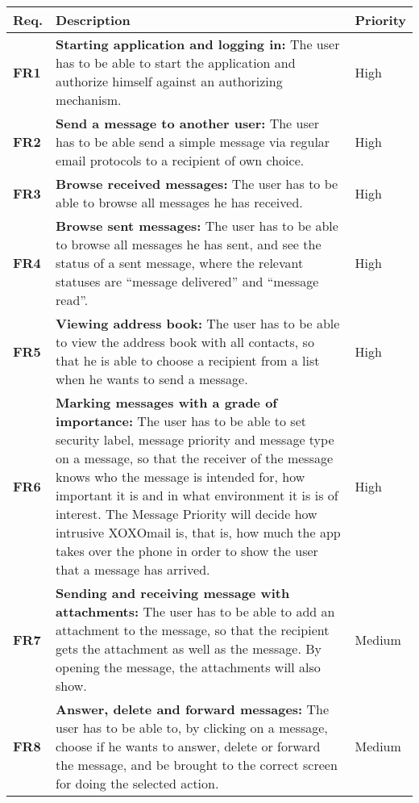 \begin{table}[hbt]
\begin{center}
\begin{tabular}{p{1.5cm}|p{12.5cm}|p{2cm}} \hline
\textbf{Req.} & \textbf{Description} & \textbf{Priority} \\ \hline \hline
\textbf{FR1} & \textbf{Starting application and logging in:} The user has to be able to start the application and authorize himself against an authorizing mechanism. & High \\ \hline
\textbf{FR2} & \textbf{Send a message to another user:} The user has to be able send a simple message via regular email protocols to a recipient of own choice. & High \\ \hline
\textbf{FR3} & \textbf{Browse received messages:} The user has to be able to browse all messages he has received. & High \\ \hline
\textbf{FR4} & \textbf{Browse sent messages:} The user has to be able to browse all messages he has sent, and see the status of a sent message, where the relevant statuses are “message delivered” and “message read”. & High \\ \hline
\textbf{FR5} & \textbf{Viewing address book:} The user has to be able to view the address book with all contacts, so that he is able to choose a recipient from a list when he wants to send a message. & High \\ \hline
\textbf{FR6} & \textbf{Marking messages with a grade of importance:} The user has to be able to set security label, message priority and message type on a message, so that the receiver of the message knows who the message is intended for, how important it is and in what environment it is is of interest. The Message Priority will decide how intrusive XOXOmail is, that is, how much the app takes over the phone in order to show the user that a message has arrived.  & High \\ \hline
\textbf{FR7} & \textbf{Sending and receiving message with attachments:} The user has to be able to add an attachment to the message, so that the recipient gets the attachment as well as the message. By opening the message, the attachments will also show. & Medium \\ \hline
\textbf{FR8} & \textbf{Answer, delete and forward messages:} The user has to be able to, by clicking on a message, choose if he wants to answer, delete or forward the message, and be brought to the correct screen for doing the selected action. & Medium \\ \hline

\end{tabular}
\end{center}
\end{table}
